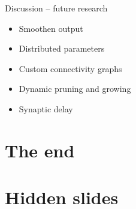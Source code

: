 \documentclass[t]{beamer}
\begin{document}
\begin{frame}{Discussion -- future research}
  \begin{itemize}[label=--]
    \item Smoothen output
    \item Distributed parameters
    \item Custom connectivity graphs
    \item Dynamic pruning and growing
    \item Synaptic delay
  \end{itemize}
\end{frame}

\section{The end}
\begin{frame}{}
\end{frame}

\section{Hidden slides}
\end{document}
